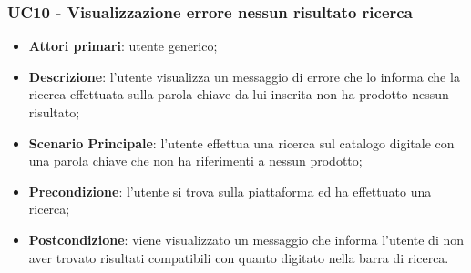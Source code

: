 \subsubsection{UC10 - Visualizzazione errore nessun risultato ricerca}
\begin{itemize}
\item \textbf{Attori primari}: utente generico;
\item \textbf{Descrizione}: l'utente visualizza un messaggio di errore che lo informa che la ricerca effettuata sulla parola chiave da lui inserita non ha prodotto nessun risultato;
\item \textbf{Scenario Principale}: l'utente effettua una ricerca sul catalogo digitale con una parola chiave che non ha riferimenti a nessun prodotto;
\item \textbf{Precondizione}: l'utente si trova sulla piattaforma ed ha effettuato una ricerca;
\item \textbf{Postcondizione}: viene visualizzato un messaggio che informa l'utente di non aver trovato risultati compatibili con quanto digitato nella barra di ricerca.
\end{itemize}
